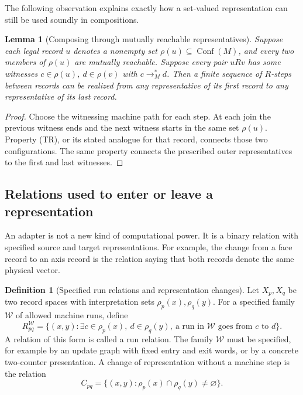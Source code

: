 \documentclass[11pt,a4paper]{article}
\newtheorem{lemma}[theorem]{Lemma}
\theoremstyle{definition}
\newtheorem{definition}[theorem]{Definition}
\theoremstyle{remark}
\begin{document}
The following observation explains exactly how a set-valued
representation can still be used soundly in compositions.

\begin{lemma}[Composing through mutually reachable representatives]
\label{lem:fibre-composition}
Suppose each legal record \(u\) denotes a nonempty set
\(\rho(u)\subseteq\operatorname{Conf}(M)\), and every two members of
\(\rho(u)\) are mutually reachable. Suppose every pair \(uRv\) has
some witnesses \(c\in\rho(u)\), \(d\in\rho(v)\) with
\(c\longrightarrow_M^*d\).
Then a finite sequence of \(R\)-steps between records can be realized
from any representative of its first record to any representative of
its last record.
\end{lemma}
\begin{proof}
Choose the witnessing machine path for each step. At each join the
previous witness ends and the next witness starts in the same set
\(\rho(u)\). Property (TR), or its stated analogue for that record,
connects those two configurations. The same property connects the
prescribed outer representatives to the first and last witnesses.
\end{proof}

\subsection{Relations used to enter or leave a representation}

An adapter is not a new kind of computational power. It is a binary
relation with specified source and target representations. For example,
the change from a face record to an axis record is the relation saying
that both records denote the same physical vector.

\begin{definition}[Specified run relations and representation changes]
\label{def:run-relations}
Let \(X_p,X_q\) be two record spaces with interpretation sets
\(\rho_p(x),\rho_q(y)\).
For a specified family \(\mathcal W\) of allowed machine runs, define
\[
 R^{\mathcal W}_{pq}
 =\{(x,y):\exists c\in\rho_p(x),\ d\in\rho_q(y),\
             \text{a run in }\mathcal W\text{ goes from }c\text{ to }d\}.
\]
A relation of this form is called a run relation.
The family \(\mathcal W\) must be specified, for example by an
update graph with fixed entry and exit words, or by a concrete
two-counter presentation.
A change of representation without a machine step is the relation
\[
 C_{pq}=\{(x,y):\rho_p(x)\cap\rho_q(y)\ne\varnothing\}.
\]
\end{definition}
\end{document}
